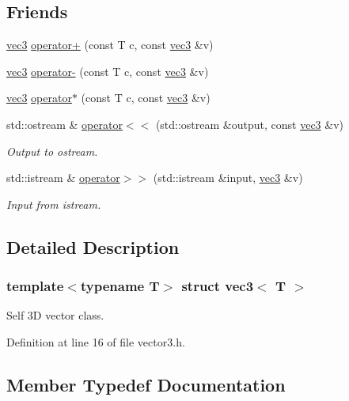 \subsection*{Friends}
\begin{DoxyCompactItemize}
\item 
\mbox{\hyperlink{structvec3}{vec3}} \mbox{\hyperlink{structvec3_a04165a00cae4ce5d2f5e142cc177a720}{operator+}} (const T c, const \mbox{\hyperlink{structvec3}{vec3}} \&v)
\item 
\mbox{\hyperlink{structvec3}{vec3}} \mbox{\hyperlink{structvec3_a6252e85a538cca25b99107166be778b1}{operator-\/}} (const T c, const \mbox{\hyperlink{structvec3}{vec3}} \&v)
\item 
\mbox{\hyperlink{structvec3}{vec3}} \mbox{\hyperlink{structvec3_a4f0b2685679a321b6c43a7406719c3a5}{operator$\ast$}} (const T c, const \mbox{\hyperlink{structvec3}{vec3}} \&v)
\item 
std\+::ostream \& \mbox{\hyperlink{structvec3_af5e1bcad9d3d484d6f4e6b3f8949f5cf}{operator$<$$<$}} (std\+::ostream \&output, const \mbox{\hyperlink{structvec3}{vec3}} \&v)
\begin{DoxyCompactList}\small\item\em Output to ostream. \end{DoxyCompactList}\item 
std\+::istream \& \mbox{\hyperlink{structvec3_a72f92578884bd68e0747871acd8545fd}{operator$>$$>$}} (std\+::istream \&input, \mbox{\hyperlink{structvec3}{vec3}} \&v)
\begin{DoxyCompactList}\small\item\em Input from istream. \end{DoxyCompactList}\end{DoxyCompactItemize}


\subsection{Detailed Description}
\subsubsection*{template$<$typename T$>$\newline
struct vec3$<$ T $>$}

Self 3D vector class. 

Definition at line 16 of file vector3.\+h.



\subsection{Member Typedef Documentation}
\mbox{\label{structvec3_a20de853e5a37c5197acba3e136a66735}} 

